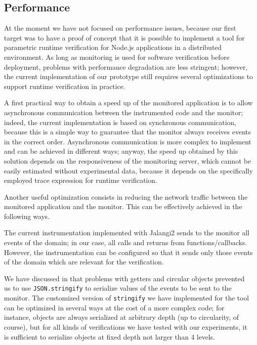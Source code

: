 \subsection{Performance}
At the moment we have not focused on performance issues, because our first target was to have a proof of concept
that it is possible to implement a tool for parametric runtime verification for Node.js applications in a distributed environment.
As long as monitoring is used for software verification before deployment, problems with performance degradation are less 
stringent; however, the current implementation of our prototype still requires several optimizations to support runtime verification
in practice.

A first practical way to obtain a speed up of the monitored application is to
allow asynchronous communication between the instrumented code and the monitor;
indeed, the current implementation is based on synchronous communication, because this is
a simple way to guarantee that the monitor always receives events in the correct order.
Asynchronous communication is more complex to implement and can be achieved in different ways;
anyway, the speed up obtained by this solution depends on the responsiveness of the monitoring server,
which cannot be easily estimated without experimental data, because it depends on the specifically employed trace expression
for runtime verification.

Another useful optimization consists in reducing the network traffic 
between the monitored application and the monitor.
This can be effectively achieved in the following ways.

The current instrumentation implemented with Jalangi2 sends to the monitor
all events of the domain; in our case, all calls and returns from functions/callbacks.
However, the instrumentation can be configured so that it sends only those events 
of the domain which are relevant for the verification.

We have discussed in  that problems with getters and circular objects
prevented us to use \lstinline{JSON.stringify} to serialize values of the events to be sent to the
monitor. The customized version of \lstinline{stringify} we have implemented for the tool
can be optimized in several ways at the cost of a more complex code; for instance,
objects are always serialized at arbitrary depth (up to circularity, of course), but for
all kinds of verifications we have tested with our experiments, it is sufficient to serialize objects
at fixed depth not larger than 4 levels.

